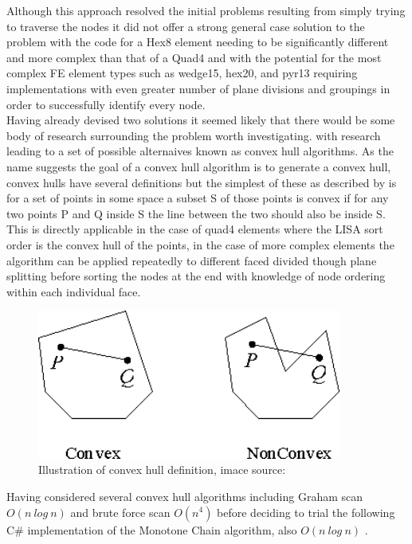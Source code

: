 \noindent
Although this approach resolved the initial problems resulting from simply trying to traverse the nodes it did not offer a strong general case solution to the problem with the code for a Hex8 element needing to be significantly different and more complex than that of a Quad4 and with the potential for the most complex FE element types such as wedge15, hex20, and pyr13 requiring implementations with even greater number of plane divisions and groupings in order to successfully identify every node. \\ 


\noindent
Having already devised two solutions it seemed likely that there would be some body of research surrounding the problem worth investigating. with research leading to a set of possible alternaives known as convex hull algorithms. As the name suggests the goal of a convex hull algorithm is to generate a convex hull, convex hulls have several definitions but the simplest of these as described by \cite{ConvexHulls} is for a set of points in some space a subset S of those points is convex if for any two points P and Q  inside S the line between the two should also be inside S. This is directly applicable in the case of quad4 elements where the LISA sort order is the convex hull of the points, in the case of more complex elements the algorithm can be applied repeatedly to different faced divided though plane splitting before sorting the nodes at the end with knowledge of node ordering within each individual face. \\ 

\begin{figure}[!h]
  \centerline{\includegraphics[width=100mm , scale=1]{../Graphics/ConvexHullGraphic.png}}
  \caption{Illustration of convex hull definition, imace source: \cite{ConvexHulls}
  }
  \label{fig:h-refinementImp}
\end{figure}


\noindent
Having considered several convex hull algorithms including Graham scan \cite{GrahamScan} $O(n\ log\ n)$ and brute force scan $O(n^4)$ \cite{ConvexHulls} \cite{BruteConvex} before deciding to trial the following C\# implementation of the Monotone Chain algorithm, also $O(n\ log\ n)$ \cite{CSharpConvexHull}. \\ 

